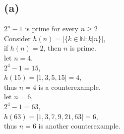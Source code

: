 \documentclass[11pt]{article}
\begin{document}
\subsection*{(a)}
\begin{center}
$2^{n} - 1$ is prime for every $n \geq 2$\\
\hfill \break
Consider $h(n) = |\{k \in \mathbb{N} : k|n\}|$,\\
if $h(n) = 2$, then $n$ is prime.\\
\hfill \break
let $n = 4$,\\
$2^{4} - 1 = 15$,\\
$h(15) = |1,3,5,15| = 4$,\\
thus $n = 4$ is a counterexample.\\
\hfill \break
let $n = 6$,\\
$2^{4} - 1 = 63$,\\
$h(63) = |1,3,7,9,21,63| = 6$,\\
thus $n = 6$ is another counterexample.
\end{center}
%
%
\end{document}
